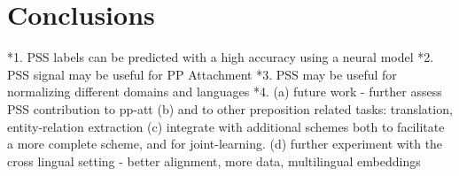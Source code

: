 \chapter{Conclusions}

*1. PSS labels can be predicted with a high accuracy using a neural model
*2. PSS signal may be useful for PP Attachment
*3. PSS may be useful for normalizing different domains and languages
*4. (a) future work - further assess PSS contribution to pp-att
(b) and to other preposition related tasks: translation, entity-relation extraction
(c) integrate with additional schemes both to facilitate a more complete scheme, and for joint-learning.
(d) further experiment with the cross lingual setting - better alignment, more data, multilingual embeddings